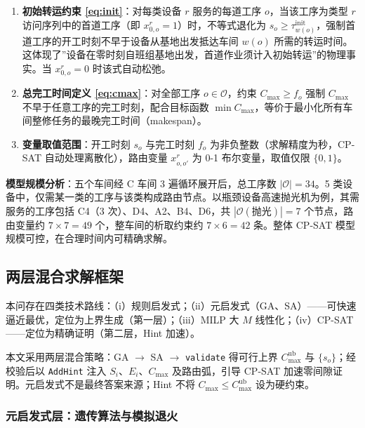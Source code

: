 \documentclass[12pt,a4paper]{ctexart}
\begin{document}
\begin{enumerate}[leftmargin=2.2em, label=(\arabic*)]
\item \textbf{初始转运约束 \eqref{eq:init}}：对每类设备 $r$ 服务的每道工序 $o$，当该工序为类型 $r$ 访问序列中的首道工序（即 $x^{r}_{0,o}=1$）时，不等式退化为 $s_o\ge\tau^{\mathrm{init}}_{w(o)}$，强制首道工序的开工时刻不早于设备从基地出发抵达车间 $w(o)$ 所需的转运时间。这体现了”设备在零时刻自班组基地出发，首道作业须计入初始转运”的物理事实。当 $x^{r}_{0,o}=0$ 时该式自动松弛。

\item \textbf{总完工时间定义 \eqref{eq:cmax}}：对全部工序 $o\in\mathcal{O}$，约束 $C_{\max}\ge f_o$ 强制 $C_{\max}$ 不早于任意工序的完工时刻，配合目标函数 $\min C_{\max}$，等价于最小化所有车间整修任务的最晚完工时间（makespan）。

\item \textbf{变量取值范围}：开工时刻 $s_o$ 与完工时刻 $f_o$ 为非负整数（求解精度为秒，CP-SAT 自动处理离散化），路由变量 $x^{r}_{o,o'}$ 为 0-1 布尔变量，取值仅限 $\{0,1\}$。
\end{enumerate}

\bigskip
\noindent\textbf{模型规模分析}：五个车间经 C 车间 3 遍循环展开后，总工序数 $|\mathcal{O}|=34$。5 类设备中，仅需某一类的工序与该类构成路由节点。以瓶颈设备高速抛光机为例，其需服务的工序包括 C4（3 次）、D4、A2、B4、D6，共 $|\mathcal{O}(\text{抛光})|=7$ 个节点，路由变量约 $7\times7=49$ 个，整车间的析取约束约 $7\times6=42$ 条。整体 CP-SAT 模型规模可控，在合理时间内可精确求解。

\subsection{两层混合求解框架}
本问存在四类技术路线：（i）规则启发式；（ii）元启发式（GA、SA）——可快速逼近最优，定位为上界生成（第一层）；（iii）MILP 大 $M$ 线性化；（iv）CP-SAT——定位为精确证明（第二层，Hint 加速）。

本文采用两层混合策略：GA $\rightarrow$ SA $\rightarrow$ \texttt{validate} 得可行上界 $C_{\max}^{\mathrm{ub}}$ 与 $\{s_o\}$；经校验后以 \texttt{AddHint} 注入 $S_i$、$E_i$、$C_{\max}$ 及路由弧，引导 CP-SAT\cite{sun2024} 加速零间隙证明。元启发式不是最终答案来源；Hint 不将 $C_{\max}\le C_{\max}^{\mathrm{ub}}$ 设为硬约束。

\subsubsection{元启发式层：遗传算法与模拟退火}
\end{document}
